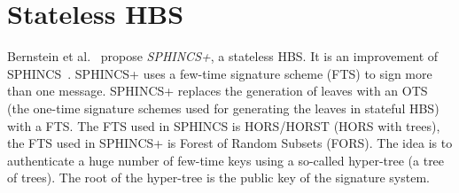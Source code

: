 \section{Stateless HBS}
Bernstein et al.~\cite{tweakable_basispaper_sphincs_2019} propose \textit{SPHINCS+}, a stateless HBS. It is an improvement of SPHINCS~\cite{sphincs_old_version_2015}.
SPHINCS+ uses a few-time signature scheme (FTS) to sign more than one message.
SPHINCS+ replaces the generation of leaves with an OTS (the one-time signature schemes used for generating the leaves in stateful HBS) with a FTS.
The FTS used in SPHINCS is HORS/HORST (HORS with trees), the FTS used in SPHINCS+ is Forest of Random Subsets (FORS). The idea is to authenticate a huge number of few-time keys using a so-called hyper-tree (a tree of trees). The root of the hyper-tree is the public key of the signature system.
~\cite{tweakable_basispaper_sphincs_2019,sphincs+_submission_nist_round2}

